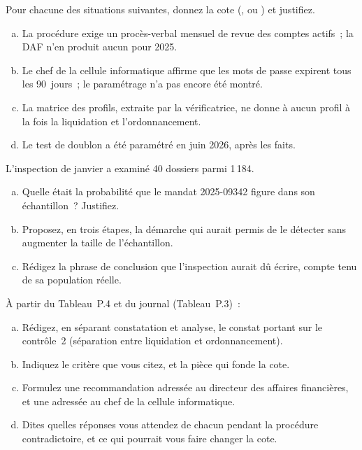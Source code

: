\begin{boxexo}[title={\ding{45}\quad Exercice~P.2. Coter un contrôle \niveaubase}]
Pour chacune des situations suivantes, donnez la cote (\OUI{}, \NON{} ou
\NEK{}) et justifiez.
\begin{enumerate}[(a)]
    \item La procédure exige un procès-verbal mensuel de revue des comptes
          actifs~; la DAF n'en produit aucun pour 2025.
    \item Le chef de la cellule informatique affirme que les mots de passe
          expirent tous les 90~jours~; le paramétrage n'a pas encore été
          montré.
    \item La matrice des profils, extraite par la vérificatrice, ne donne
          à aucun profil à la fois la liquidation et l'ordonnancement.
    \item Le test de doublon a été paramétré en juin 2026, après les
          faits.
\end{enumerate}
\end{boxexo}

\begin{boxexo}[title={\ding{45}\quad Exercice~P.3. Deux populations \niveaumoyen}]
L'inspection de janvier a examiné 40 dossiers parmi 1\,184.
\begin{enumerate}[(a)]
    \item Quelle était la probabilité que le mandat 2025-09342 figure dans
          son échantillon~? Justifiez.
    \item Proposez, en trois étapes, la démarche qui aurait permis de le
          détecter sans augmenter la taille de l'échantillon.
    \item Rédigez la phrase de conclusion que l'inspection aurait dû
          écrire, compte tenu de sa population réelle.
\end{enumerate}
\end{boxexo}

\begin{boxexo}[title={\ding{45}\quad Exercice~P.4. Le premier constat \niveauexpert}]
À partir du Tableau~P.4 et du journal (Tableau~P.3)~:
\begin{enumerate}[(a)]
    \item Rédigez, en séparant constatation et analyse, le constat portant
          sur le contrôle~2 (séparation entre liquidation et
          ordonnancement).
    \item Indiquez le critère que vous citez, et la pièce qui fonde la
          cote.
    \item Formulez une recommandation adressée au directeur des affaires
          financières, et une adressée au chef de la cellule
          informatique.
    \item Dites quelles réponses vous attendez de chacun pendant la
          procédure contradictoire, et ce qui pourrait vous faire changer
          la cote.
\end{enumerate}
\end{boxexo}

